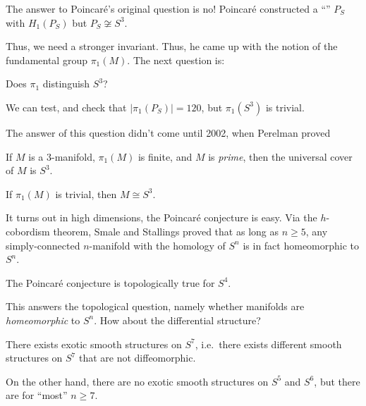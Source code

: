 \documentclass[a4paper]{article}
\begin{document}
The answer to Poincar\'e's original question is no! Poincar\'e constructed a ``'' $P_S$ with $H_1(P_S)$ but $P_S \not\cong S^3$.

Thus, we need a stronger invariant. Thus, he came up with the notion of the fundamental group $\pi_1(M)$. The next question is:
\begin{center}
  Does $\pi_1$ distinguish $S^3$?
\end{center}
We can test, and check that $|\pi_1(P_S)| = 120$, but $\pi_1(S^3)$ is trivial.

The answer of this question didn't come until 2002, when Perelman proved
\begin{thm}
  If $M$ is a $3$-manifold, $\pi_1(M)$ is finite, and $M$ is \emph{prime}, then the universal cover of $M$ is $S^3$.
\end{thm}

\begin{cor}
  If $\pi_1(M)$ is trivial, then $M \cong S^3$.
\end{cor}


It turns out in high dimensions, the Poincar\'e conjecture is easy. Via the $h$-cobordism theorem, Smale and Stallings proved that as long as $n \geq 5$, any simply-connected $n$-manifold with the homology of $S^n$ is in fact homeomorphic to $S^n$.

\begin{thm}[Freedman]
  The Poincar\'e conjecture is topologically true for $S^4$.
\end{thm}

This answers the topological question, namely whether manifolds are \emph{homeomorphic} to $S^n$. How about the differential structure?
\begin{thm}[Milnor]
  There exists exotic smooth structures on $S^7$, i.e.\ there exists different smooth structures on $S^7$ that are not diffeomorphic.
\end{thm}

On the other hand, there are no exotic smooth structures on $S^5$ and $S^6$, but there are for ``most'' $n \geq 7$.
\end{document}
